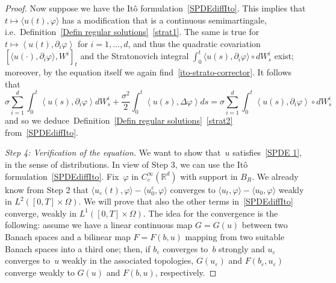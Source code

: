 \documentclass[a4paper,10pt]{article}
\newcommand\1{\mathbbm{1}}
\newcommand{\lan}{\langle}
\newcommand{\ran}{\rangle}
\newcommand{\eps}{\varepsilon}
\numberwithin{equation}{section}
\begin{document}
\begin{proof}
Now suppose we have the It\^o formulation~\eqref{SPDEdiffIto}. This implies that $t\mapsto \langle u(t),\varphi \rangle $ has a modification that is a continuous semimartingale, i.e.~Definition~\ref{Defin regular solutions}~\ref{strat1}. The same is true for $t\mapsto\left\langle u(t),\partial_{i} \varphi\right\rangle $ for $i=1,\ldots,d$, and thus the quadratic covariation $[\langle u(\cdot),\partial_{i}\varphi \rangle ,W^{i}]_{t}$ and the Stratonovich integral $\int_{0}^{t} \langle u(s),\partial_{i}\varphi \rangle \circ dW_{s}^{i}$ exist; moreover, by the equation itself we again find~\eqref{ito-strato-corrector}. It follows that
\begin{equation*}
\sigma\sum_{i=1}^{d}\int_{0}^{t}\left\langle u(  s)  ,\partial
_{i}\varphi\right\rangle dW_{s}^{i}+\frac{\sigma^{2}}{2}\int_{0} 
^{t}\left\langle u(  s)  ,\Delta\varphi\right\rangle
ds=\sigma\sum_{i=1}^{d}\int_{0}^{t}\left\langle u(  s)
,\partial_{i}\varphi\right\rangle \circ dW_{s}^{i}
\end{equation*}
and so we deduce~Definition~\ref{Defin regular solutions}~\ref{strat2} from~\eqref{SPDEdiffIto}.

\emph{Step 4: Verification of the equation.} We want to show that~$u$ satisfies~\eqref{SPDE 1}, in the sense of distributions. In view of Step 3, we can use the It\^o formulation~\eqref{SPDEdiffIto}. Fix~$\varphi$ in $C^\infty_c(\mathbb{R}^d)$ with support in $B_R$. We already know from Step 2 that $\lan u_\eps(t),\varphi\ran-\lan u^\eps_0,\varphi\ran$ converges to $\lan u_t,\varphi\ran-\lan u_0,\varphi\ran$ weakly in $L^2([0,T]\times\Omega)$. We will prove that also the other terms in~\eqref{SPDEdiffIto} converge, weakly in $L^1([0,T]\times\Omega)$. The idea for the convergence is the following: assume we have a linear continuous map $G=G(u)$ between two Banach spaces and a bilinear map $F=F(b,u)$ mapping from two suitable Banach spaces into a third one; then, if $b_\eps$ converges to~$b$ strongly and $u_\eps$ converges to~$u$ weakly in the associated topologies, $G(u_\eps)$ and $F(b_\eps,u_\eps)$ converge weakly to $G(u)$ and $F(b,u)$, respectively.


\end{proof}
\end{document}
